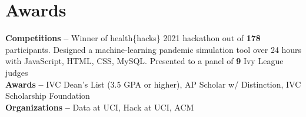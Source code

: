 \documentclass[letterpaper,11pt]{article}
\begin{document}
\section{Awards}
\begin{itemize}[leftmargin=0.15in, label={}]
    \small{\item{
        \textbf{Competitions }{\textbf{--} Winner of health\{hacks\} 2021 hackathon out of \textbf{178} participants. Designed a machine-learning pandemic simulation tool over 24 hours with JavaScript, HTML, CSS, MySQL. Presented to a panel of \textbf{9} Ivy League judges}} \\
        \textbf{Awards }{\textbf{--} IVC Dean's List (3.5 GPA or higher), AP Scholar w/ Distinction, IVC Scholarship Foundation} \\
        \textbf{Organizations }{\textbf{--} Data at UCI, Hack at UCI, ACM} \\
    }
\end{itemize}


\end{document}
